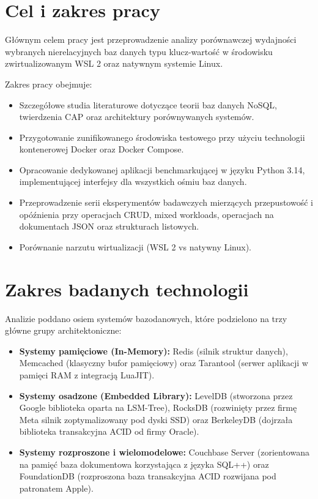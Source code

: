 \section{Cel i zakres pracy}
Głównym celem pracy jest przeprowadzenie analizy porównawczej wydajności wybranych nierelacyjnych baz danych typu klucz-wartość w środowisku zwirtualizowanym WSL 2 oraz natywnym systemie Linux. 

Zakres pracy obejmuje:
\begin{itemize}
    \item Szczegółowe studia literaturowe dotyczące teorii baz danych NoSQL, twierdzenia CAP oraz architektury porównywanych systemów.
    \item Przygotowanie zunifikowanego środowiska testowego przy użyciu technologii kontenerowej Docker oraz Docker Compose.
    \item Opracowanie dedykowanej aplikacji benchmarkującej w języku Python 3.14, implementującej interfejsy dla wszystkich ośmiu baz danych.
    \item Przeprowadzenie serii eksperymentów badawczych mierzących przepustowość i opóźnienia przy operacjach CRUD, mixed workloads, operacjach na dokumentach JSON oraz strukturach listowych.
    \item Porównanie narzutu wirtualizacji (WSL 2 vs natywny Linux).
\end{itemize}

\section{Zakres badanych technologii}
Analizie poddano osiem systemów bazodanowych, które podzielono na trzy główne grupy architektoniczne:
\begin{itemize}
    \item \textbf{Systemy pamięciowe (In-Memory):} Redis (silnik struktur danych), Memcached (klasyczny bufor pamięciowy) oraz Tarantool (serwer aplikacji w pamięci RAM z integracją LuaJIT).
    \item \textbf{Systemy osadzone (Embedded Library):} LevelDB (stworzona przez Google biblioteka oparta na LSM-Tree), RocksDB (rozwinięty przez firmę Meta silnik zoptymalizowany pod dyski SSD) oraz BerkeleyDB (dojrzała biblioteka transakcyjna ACID od firmy Oracle).
    \item \textbf{Systemy rozproszone i wielomodelowe:} Couchbase Server (zorientowana na pamięć baza dokumentowa korzystająca z języka SQL++) oraz FoundationDB (rozproszona baza transakcyjna ACID rozwijana pod patronatem Apple).
\end{itemize}

